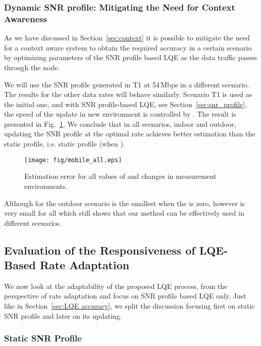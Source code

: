 \documentclass[11pt,draftclsnofoot,journal,onecolumn]{IEEEtran}
\begin{document}
\subsubsection{Dynamic SNR profile: Mitigating the Need for Context Awareness}
\label{sec:result_self_updating}

As we have discussed in Section~\ref{sec:context} it is possible to mitigate the need for a context aware system to obtain the required accuracy in a certain scenario by optimizing parameters of the SNR profile based LQE as the data traffic passes through the node.

We will use the SNR profile generated in T1 at 54\,Mbps in a different scenario. The results for the other data rates will behave similarly. Scenario T1 is used as the initial one, and with SNR profile-based LQE, see Section~\ref{sec:snr_profile}, the speed of the update in new environment is controlled by . The result is presented in Fig.~\ref{Fig_Updating effect}. We conclude that in all scenarios, indoor and outdoor, updating the SNR profile at the optimal rate achieves better estimation than the static profile, i.e. static profile (when ).
\begin{figure}
\centering
\texttt{[image: fig/mobile\_all.eps]}
\caption{Estimation error  for all values of  and changes in measurement environments.}
\label{Fig_Updating effect}
\end{figure}


Although for the outdoor scenario  is the smallest when the  is zero, however  is very small for all  which still shows that our method can be effectively used in different scenarios.

\subsection{Evaluation of the Responsiveness of LQE-Based Rate Adaptation}
\label{sec:result_rate_adaptation}

We now look at the adaptability of the proposed LQE process, from the perspective of rate adaptation and focus on SNR profile based LQE only. Just like in Section~\ref{sec:LQE accuracy}, we split the discussion focusing first on static SNR profile and later on its updating.

\subsubsection{Static SNR Profile}
\label{sec:rate_static_profile}
\end{document}
